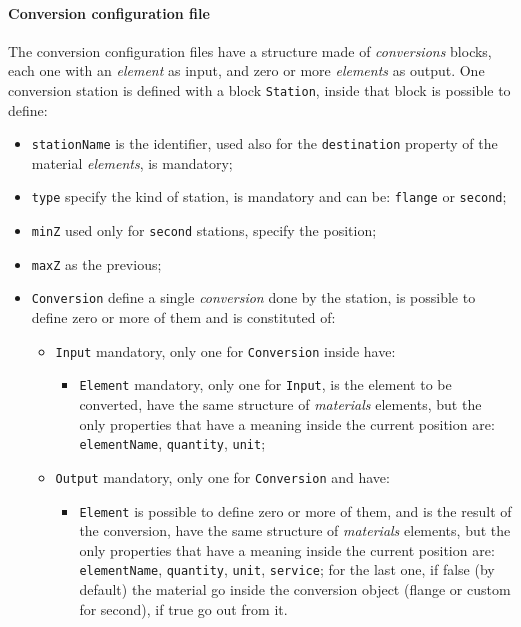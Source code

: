 \documentclass[12pt, a4paper]{article}
\newcommand{\prop}[1]{\texttt{#1}}
\begin{document}
\paragraph{Conversion configuration file}
The conversion configuration files have a structure made of
\emph{conversions} blocks, each one with an \emph{element} as
input, and zero or more \emph{elements} as output. One conversion
station is defined with a block \prop{Station}, inside that block is
possible to define:
\begin{itemize}
\item \prop{stationName} is the identifier, used also
  for the \prop{destination} property of the material \emph{elements},
  is mandatory;
\item \prop{type} specify the kind of station, is
  mandatory and can be: \prop{flange} or \prop{second};
\item \prop{minZ} used only for \prop{second}
  stations, specify the position;
\item \prop{maxZ} as the previous;
\item \prop{Conversion} define a single \emph{conversion} done by the
  station, is possible to define zero or more of them and is
  constituted of:
  \begin{itemize}
  \item \prop{Input} mandatory, only one for \prop{Conversion} inside have:
    \begin{itemize}
    \item \prop{Element} mandatory, only one for \prop{Input}, is
      the element to be converted, have the same structure of
      \emph{materials} elements, but the only properties that have a
      meaning inside the current position are: \prop{elementName},
      \prop{quantity}, \prop{unit};
    \end{itemize}
  \item \prop{Output} mandatory, only one for
    \prop{Conversion} and have:
    \begin{itemize}
    \item \prop{Element} is possible to define zero or more of them,
      and is the result of the conversion, have the same structure of
      \emph{materials} elements, but the only properties that have a
      meaning inside the current position are: \prop{elementName},
      \prop{quantity}, \prop{unit}, \prop{service}; for the last one, if false (by default) the
      material go inside the conversion object (flange or custom
      for second), if true go out from it.
    \end{itemize}
  \end{itemize}
\end{itemize}
\end{document}
